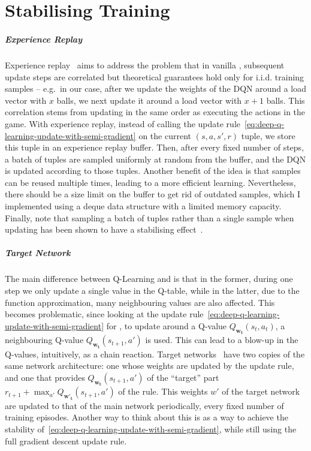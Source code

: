 \chapter{Stabilising Training}\label{stabilising-training} 



\paragraph{Experience Replay}

Experience replay~\cite{lin1992experiencereplay} aims to address the problem that in vanilla \DQL, subsequent update steps are correlated but theoretical guarantees hold only for i.i.d. training samples -- e.g.\  in our case, after we update the weights of the DQN around a load vector with $x$ balls, we next update it around a load vector with $x+1$ balls. This correlation stems from updating in the same order as executing the actions in the game. With experience replay, instead of calling the update rule~\eqref{eq:deep-q-learning-update-with-semi-gradient} on the current $(s, a, s', r)$ tuple, we store this tuple in an experience replay buffer. Then, after every fixed number of steps, a batch of tuples are sampled uniformly at random from the buffer, and the DQN is updated according to those tuples. Another benefit of the idea is that samples can be reused multiple times, leading to a more efficient learning. Nevertheless, there should be a size limit on the buffer to get rid of outdated samples, which I implemented using a deque data structure with a limited memory capacity. Finally, note that sampling a batch of tuples rather than a single sample when updating has been shown to have a stabilising effect~\cite{qian2020batchingsgd}.


\paragraph{Target Network}


The main difference between Q-Learning and \DQL is that in the former, during one step we only update a single value in the Q-table, while in the latter, due to the function approximation, many neighbouring values are also affected. This becomes problematic, since looking at the update rule~\eqref{eq:deep-q-learning-update-with-semi-gradient} for \DQL, to update around a Q-value $Q_{\mathbf{w_t}}(s_t, a_t)$, a neighbouring Q-value $Q_{\mathbf{w_t}}(s_{t+1}, a')$ is used. This can lead to a blow-up in the Q-values, intuitively, as a chain reaction. Target networks~\cite{argueta1992targetnetwork} have two copies of the same network architecture: one whose weights are updated by the update rule, and one that provides $Q_{\mathbf{w_t}}(s_{t+1}, a')$ of the ``target'' part $r_{t+1}+ \max_{a'} Q_{\mathbf{w'_t}}(s_{t+1}, a')$ of the rule. This weights $w'$ of the target network are updated to that of the main network periodically, every fixed number of training episodes. Another way to think about this is as a way to achieve the stability of~\eqref{eq:deep-q-learning-update-with-semi-gradient}, while still using the full gradient descent update rule.



